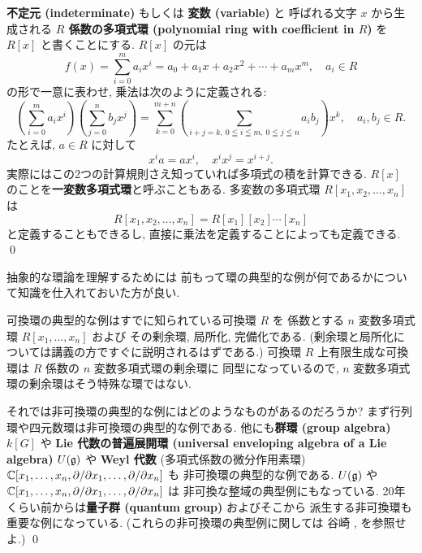 \documentclass[12pt,twoside]{jarticle}
\begin{document}
\begin{definition}[多項式環]
 {\bf 不定元 (indeterminate)} もしくは {\bf 変数 (variable)} と
 呼ばれる文字 $x$ から生成される {\bf $R$ 係数の多項式環 
 (polynomial ring with coefficient in $R$)} を $R[x]$ と書くことにする.
 $R[x]$ の元は
 \begin{equation*}
  f(x) = \sum_{i=0}^m a_i x^i
  = a_0 + a_1 x + a_2 x^2 + \cdots + a_m x^m, 
  \quad
  a_i \in R
 \end{equation*}
 の形で一意に表わせ, 乗法は次のように定義される:
 \begin{equation*}
  \left(\sum_{i=0}^m a_i x^i\right)
  \left(\sum_{j=0}^n b_j x^j\right)
  = \sum_{k=0}^{m+n} 
  \left(\sum_{i+j=k,\ 0\leqq i\leqq m,\ 0\leqq j\leqq n} a_ib_j\right) x^k,
  \quad
  a_i,b_j\in R.
 \end{equation*}
 たとえば, $a\in R$ に対して
 \begin{equation*}
  x^i a = a x^i, \quad x^i x^j = x^{i+j}.
 \end{equation*}
 実際にはこの2つの計算規則さえ知っていれば多項式の積を計算できる.
 $R[x]$ のことを{\bf 一変数多項式環}と呼ぶこともある.
 多変数の多項式環 $R[x_1,x_2,\ldots,x_n]$ は 
 \begin{equation*}
  R[x_1,x_2,\ldots,x_n] = R[x_1][x_2]\cdots[x_n]
 \end{equation*}
 と定義することもできるし, 直接に乗法を定義することによっても定義できる.
 \qed
\end{definition}

\begin{guide}[環の典型的な例]
 抽象的な環論を理解するためには
 前もって環の典型的な例が何であるかについて知識を仕入れておいた方が良い.

 可換環の典型的な例はすでに知られている可換環 $R$ を
 係数とする $n$ 変数多項式環 $R[x_1,\ldots,x_n]$ および
 その剰余環, 局所化, 完備化である.
 (剰余環と局所化については講義の方ですぐに説明されるはずである.)
 可換環 $R$ 上有限生成な可換環は $R$ 係数の $n$ 変数多項式環の剰余環に
 同型になっているので, $n$ 変数多項式環の剰余環はそう特殊な環ではない.

 それでは非可換環の典型的な例にはどのようなものがあるのだろうか?
 まず行列環や四元数環は非可換環の典型的な例である.
 他にも{\bf 群環 (group algebra)} $k[G]$ や 
 {\bf Lie 代数の普遍展開環 
 (universal enveloping algebra of a Lie  algebra)} $U({\mathfrak g})$ や
 {\bf Weyl 代数} (多項式係数の微分作用素環) %
 ${\mathbb C}[x_1,\ldots,x_n,\partial/\partial x_1,\ldots,\partial/\partial x_n]$ も
 非可換環の典型的な例である.
 $U({\mathfrak g})$ や ${\mathbb C}[x_1,\ldots,x_n,\partial/\partial x_1,\ldots,\partial/\partial x_n]$ は
 非可換な整域の典型例にもなっている.
 20年くらい前からは{\bf 量子群 (quantum group)} およびそこから
 派生する非可換環も重要な例になっている.
 (これらの非可換環の典型例に関しては
 谷崎 \cite{tanisaki-1998}, \cite{tanisaki-2002} を参照せよ.)
 \qed
\end{guide}
\end{document}
